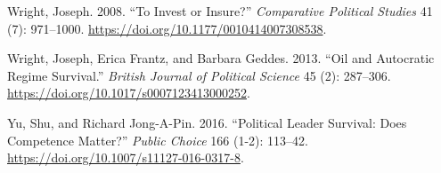 \documentclass[
  12pt,
]{report}
\newlength{\cslhangindent}
\newenvironment{CSLReferences}[2] %
 {\begin{list}{}{%
  \setlength{\itemindent}{0pt}
  \setlength{\leftmargin}{0pt}
  \setlength{\parsep}{0pt}
  \ifodd #1
   \setlength{\leftmargin}{\cslhangindent}
   \setlength{\itemindent}{-1\cslhangindent}
  \fi
  \setlength{\itemsep}{#2\baselineskip}}}
 {\end{list}}
\begin{document}
\begin{CSLReferences}{1}{0}
Wright, Joseph. 2008. {``To Invest or Insure?''} \emph{Comparative
Political Studies} 41 (7): 971--1000.
\url{https://doi.org/10.1177/0010414007308538}.

Wright, Joseph, Erica Frantz, and Barbara Geddes. 2013. {``Oil and
Autocratic Regime Survival.''} \emph{British Journal of Political
Science} 45 (2): 287--306.
\url{https://doi.org/10.1017/s0007123413000252}.

Yu, Shu, and Richard Jong-A-Pin. 2016. {``Political Leader Survival:
Does Competence Matter?''} \emph{Public Choice} 166 (1-2): 113--42.
\url{https://doi.org/10.1007/s11127-016-0317-8}.

\end{CSLReferences}
\end{document}
